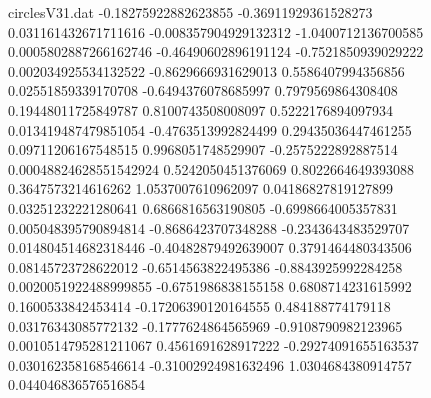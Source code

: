 \begin{filecontents}{circlesV31.dat}
-0.18275922882623855	-0.36911929361528273	0.031161432671711616
-0.008357904929132312	-1.0400712136700585	0.0005802887266162746
-0.46490602896191124	-0.7521850939029222	0.002034925534132522
-0.8629666931629013	0.5586407994356856	0.02551859339170708
-0.6494376078685997	0.7979569864308408	0.19448011725849787
0.8100743508008097	0.5222176894097934	0.013419487479851054
-0.4763513992824499	0.29435036447461255	0.09711206167548515
0.9968051748529907	-0.2575222892887514	0.00048824628551542924
0.5242050451376069	0.8022664649393088	0.3647573214616262
1.0537007610962097	0.04186827819127899	0.03251232221280641
0.6866816563190805	-0.6998664005357831	0.005048395790894814
-0.8686423707348288	-0.2343643483529707	0.014804514682318446
-0.40482879492639007	0.3791464480343506	0.08145723728622012
-0.6514563822495386	-0.8843925992284258	0.0020051922488999855
-0.6751986838155158	0.6808714231615992	0.1600533842453414
-0.17206390120164555	0.484188774179118	0.03176343085772132
-0.1777624864565969	-0.9108790982123965	0.0010514795281211067
0.4561691628917222	-0.29274091655163537	0.030162358168546614
-0.31002924981632496	1.0304684380914757	0.044046836576516854
\end{filecontents}
